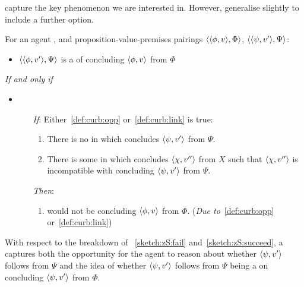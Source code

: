 \begin{note}
   capture the key phenomenon we are interested in.
  However, generalise slightly to include a further option.
\end{note}

\begin{note}[\curb{3}]
  \begin{definition}[A \curb{0}]
    \label{def:curb}
    For an agent \vAgent{}, and proposition-value-premises pairings \(\langle \langle \phi, v \rangle, \Phi \rangle\), \(\langle \langle \psi, v' \rangle, \Psi \rangle\):

    \begin{itemize}
    \item
      \(\langle \langle \phi, v' \rangle, \Psi \rangle\) is a \emph{\curb{}} of concluding \(\langle \phi, v \rangle\) from \(\Phi\)
    \end{itemize}

    \emph{If and only if}

    \begin{itemize}
    \item
        \begin{enumerate}
        \item[\emph{If}:]
          Either~\ref{def:curb:opp} or~\ref{def:curb:link} is true:

          \begin{enumerate}[label=\alph*., ref=(\alph*)]
          \item
            \label{def:curb:opp}
            There is no \pevent{} in which \vAgent{} concludes \(\langle \psi, v' \rangle\) from \(\Psi\).
          \item
            \label{def:curb:link}
            There is some \pevent{} in which \vAgent{} concludes \(\langle \chi, v'' \rangle\) from \(X\) such that \(\langle \chi, v'' \rangle\) is incompatible with concluding \(\langle \psi, v' \rangle\) from \(\Psi\).
          \end{enumerate}
        \item[\emph{Then}:]
          \begin{enumerate}[label=\alph*., ref=(\alph*), resume]
          \item
            \label{def:curb:fail}
            \vAgent{} would not be concluding \(\langle \phi, v \rangle\) from \(\Phi\).%
            \hfill(\emph{Due to}~\ref{def:curb:opp} or~\ref{def:curb:link})
          \end{enumerate}
      \end{enumerate}
    \end{itemize}
    \vspace{-\baselineskip}
  \end{definition}

  With respect to the breakdown of ~\ref{sketch:zS:fail} and~\ref{sketch:zS:succeed}, a \curb{} captures both the opportunity for the agent to reason about whether \(\langle \psi, v' \rangle\) follows from \(\Psi\) and the idea of whether \(\langle \psi, v' \rangle\) follows from \(\Psi\) being a  on concluding \(\langle \psi, v' \rangle\) from \(\Phi\).
\end{note}

